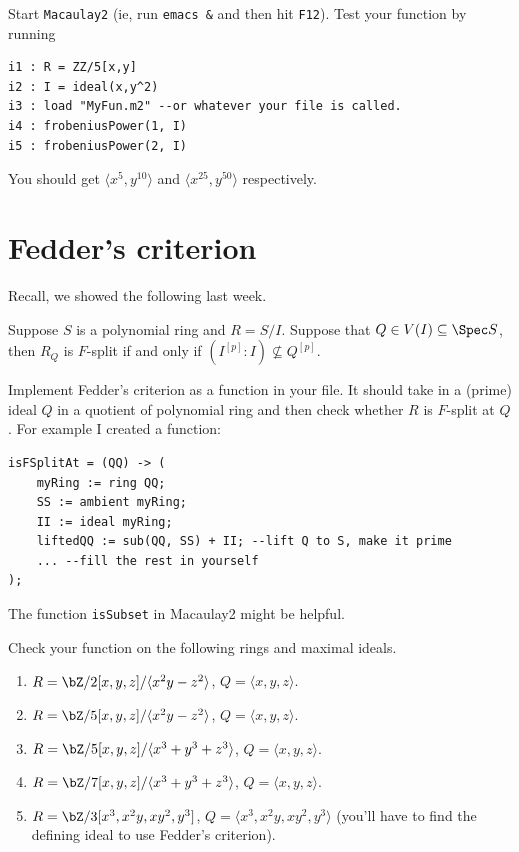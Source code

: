 \documentclass[12pt]{amsart}
\numberwithin{equation}{theorem}
\renewcommand{\:}{\colon}
\begin{document}
Start {\tt Macaulay2} (ie, run {\tt emacs \&} and then hit {\tt F12}).  Test your function by running
\begin{verbatim}
i1 : R = ZZ/5[x,y]
i2 : I = ideal(x,y^2)
i3 : load "MyFun.m2" --or whatever your file is called.
i4 : frobeniusPower(1, I)
i5 : frobeniusPower(2, I)
\end{verbatim}
You should get $\langle x^5, y^{10} \rangle$ and $\langle x^{25}, y^{50} \rangle$ respectively.

\section{Fedder's criterion}

Recall, we showed the following last week.

\begin{theorem*}
Suppose $S$ is a polynomial ring and $R = S/I$.  Suppose that $Q \in V(I) \subseteq \Spec S$, then $R_Q$ is $F$-split if and only if $(I^{[p]} : I) \not\subseteq Q^{[p]}$.
\end{theorem*}

\begin{exercise}
Implement Fedder's criterion as a function in your file.  It should take in a (prime) ideal $Q$ in a quotient of polynomial ring and then check whether $R$ is $F$-split at $Q$.  For example I created a function:
\begin{verbatim}
isFSplitAt = (QQ) -> (
    myRing := ring QQ;
    SS := ambient myRing;
    II := ideal myRing;
    liftedQQ := sub(QQ, SS) + II; --lift Q to S, make it prime
    ... --fill the rest in yourself
);
\end{verbatim}
The function {\tt isSubset} in Macaulay2 might be helpful.

Check your function on the following rings and maximal ideals.
\begin{enumerate}
\item $R = \bZ/2[x,y,z]/\langle x^2 y - z^2 \rangle$, $Q = \langle x,y,z \rangle$.
\item $R = \bZ/5[x,y,z]/\langle x^2 y - z^2 \rangle$, $Q = \langle x,y,z \rangle$.
\item $R = \bZ/5[x,y,z]/\langle x^3 + y^3 + z^3 \rangle$, $Q = \langle x,y,z \rangle$.
\item $R = \bZ/7[x,y,z]/\langle x^3 + y^3 + z^3 \rangle$, $Q = \langle x,y,z \rangle$.
\item $R = \bZ/3[x^3, x^2 y, xy^2, y^3]$, $Q = \langle x^3, x^2 y, xy^2, y^3 \rangle$ (you'll have to find the defining ideal to use Fedder's criterion).
\end{enumerate}
\end{exercise}
\end{document}
